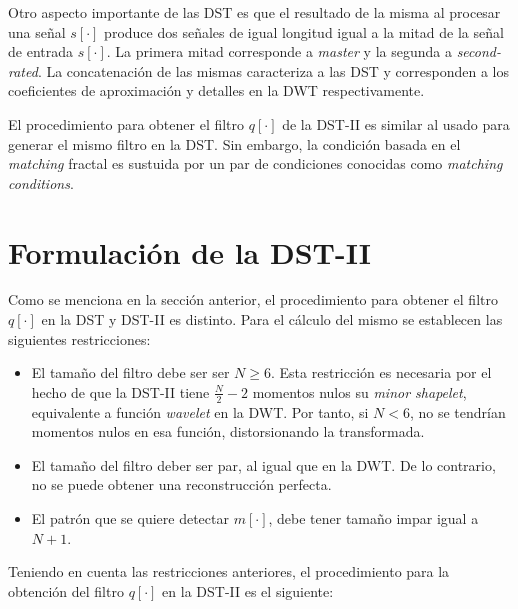 Otro aspecto importante de las DST es que el resultado de la misma al procesar una señal $s[\cdot]$ produce dos 
señales de igual longitud igual a la mitad de la señal de entrada $s[\cdot]$. La primera mitad corresponde a 
\textit{master} y la segunda a \textit{second-rated}. La concatenación de las mismas caracteriza a las DST
y corresponden a los coeficientes de aproximación y detalles en la DWT respectivamente.

El procedimiento para obtener el filtro $q[\cdot]$ de la DST-II es similar al usado para generar el mismo filtro
en la DST. Sin embargo, la condición basada en el \textit{matching} fractal es sustuida por un par de condiciones
conocidas como \textit{matching conditions}.


\section{Formulación de la DST-II}\label{algoritmo:dst-2}

Como se menciona en la sección anterior, el procedimiento para obtener el filtro $q[\cdot]$ en la DST y DST-II
es distinto. Para el cálculo del mismo se establecen las siguientes restricciones:

\begin{itemize}
	\item El tamaño del filtro debe ser ser $N \geq 6$. Esta restricción es necesaria por el hecho de que la 
		DST-II tiene $\frac{N}{2}-2$  momentos nulos su \textit{minor shapelet}, equivalente a función \textit{wavelet}
		en la DWT. Por tanto, si $N<6$, no se tendrían momentos nulos en esa función, distorsionando la transformada.
	\item El tamaño del filtro deber ser par, al igual que en la DWT. De lo contrario, no se puede obtener una 
		reconstrucción perfecta.
	\item El patrón que se quiere detectar $m[\cdot]$, debe tener tamaño impar igual a $N+1$.
\end{itemize}

Teniendo en cuenta las restricciones anteriores, el procedimiento para la obtención del filtro $q[\cdot]$ en la DST-II 
es el siguiente:

